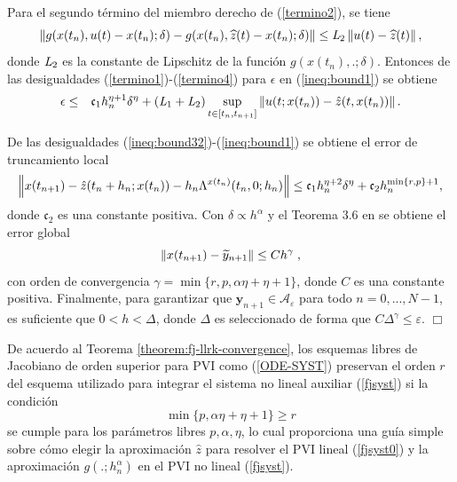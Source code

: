 Para el segundo término del miembro derecho de (\ref{termino2}), se tiene
\begin{equation}
    \left\lVert g(x(t_n),u(t)-x(t_n);\delta)-g(x(t_n),\widehat{z}(t)-x(t_n);\delta) \right\rVert \leq  \emph{L}_2\left\lVert u(t)-\widehat{z}(t) \right\rVert,
    \label{termino4}
\end{equation}
donde $\emph{L}_2$ es la constante de Lipschitz de la función $g(x(t_n),.;\delta)$. Entonces de las desigualdades (\ref{termino1})-(\ref{termino4}) para $\epsilon$ en (\ref{ineq:bound1}) se obtiene
\begin{eqnarray*}
	\epsilon & \leq & \mathfrak{c}_1 h_n^{\eta+1}\delta^{\eta} +  (\emph{L}_1+\emph{L}_2) \sup\limits_{t\in[t_n,t_{n+1}]} \left\lVert u(t;x(t_n))-\hat{z}(t,x(t_n)) \right\rVert.
\end{eqnarray*}

De las desigualdades (\ref{ineq:bound32})-(\ref{ineq:bound1}) se obtiene el error de truncamiento local
\begin{equation*}
    \left\lVert x(t_{n+1})-\hat{z}(t_n+h_n;x(t_n))-h_n\Lambda^{x(t_n)}(t_n,0;h_n) \right\rVert\leq \mathfrak{c}_1 h_n^{\eta+2}\delta^{\eta} + \mathfrak{c}_2 h_n^{\min\{r,p\}+1},
\end{equation*}
donde $\mathfrak{c}_2$ es una constante positiva. Con $\delta\propto h^{\alpha}$ y el Teorema 3.6 en \cite{hairer1993solving} se obtiene el error global
\begin{equation*}
    \left\lVert x(t_{n+1})-\widetilde{y}_{n+1} \right\rVert\leq Ch^\gamma \;,
\end{equation*}
con orden de convergencia  $\gamma = \min\{r,p,\alpha\eta+\eta+1\}$, donde $C$ es una constante positiva. Finalmente, para garantizar que
$\mathbf{y}_{n+1}\in \mathcal{A}_{\varepsilon }$
para todo $n=0,...,N-1$, es suficiente que  $0<h<\Delta $, donde  $\Delta$ es seleccionado de forma que  $C\Delta ^{\gamma
}\leq \varepsilon $. $\Box$

De acuerdo al Teorema \ref{theorem:fj-llrk-convergence}, los esquemas libres de Jacobiano de orden superior para PVI como (\ref{ODE-SYST}) preservan el orden $r$ del esquema utilizado para integrar el sistema no lineal auxiliar (\ref{fjsyst}) si la condición
\begin{equation*}
    \min\{p,\alpha\eta+\eta+1\} \geq r
\end{equation*}
se cumple para los parámetros libres $p,\alpha,\eta$, lo cual proporciona una guía simple sobre cómo elegir la aproximación $\widehat{z}$ para resolver el PVI lineal (\ref{fjsyst0}) y la aproximación $g(.;h^{\alpha}_n)$ en el PVI no lineal (\ref{fjsyst}).


